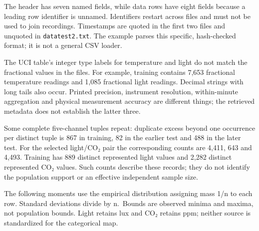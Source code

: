 The header has seven named fields, while data rows have eight fields because a leading row identifier is unnamed. Identifiers restart across files and must not be used to join recordings. Timestamps are quoted in the first two files and unquoted in \texttt{datatest2.txt}. The example parses this specific, hash-checked format; it is not a general CSV loader.

The UCI table's integer type labels for temperature and light do not match the fractional values in the files. For example, training contains 7,653 fractional temperature readings and 1,085 fractional light readings. Decimal strings with long tails also occur. Printed precision, instrument resolution, within-minute aggregation and physical measurement accuracy are different things; the retrieved metadata does not establish the latter three.

Some complete five-channel tuples repeat: duplicate excess beyond one occurrence per distinct tuple is 867 in training, 82 in the earlier test and 488 in the later test. For the selected light/CO₂ pair the corresponding counts are 4,411, 643 and 4,493. Training has 889 distinct represented light values and 2,282 distinct represented CO₂ values. Such counts describe these records; they do not identify the population support or an effective independent sample size.

The following moments use the empirical distribution assigning mass 1/n to each row. Standard deviations divide by n.~Bounds are observed minima and maxima, not population bounds. Light retains lux and CO₂ retains ppm; neither source is standardized for the categorical map.

